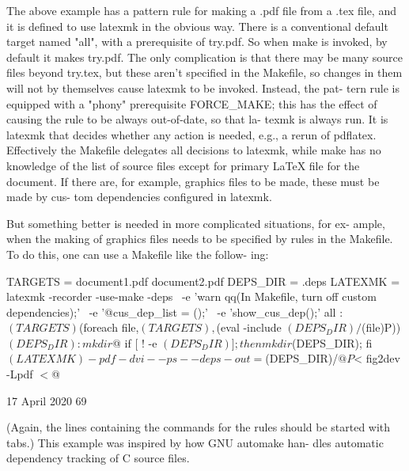        The above example has a pattern rule for making a .pdf file from a .tex
       file,  and it is defined to use latexmk in the obvious way.  There is a
       conventional  default  target  named  "all",  with  a  prerequisite  of
       try.pdf.   So  when  make is invoked, by default it makes try.pdf.  The
       only complication is  that  there  may  be  many  source  files  beyond
       try.tex, but these aren't specified in the Makefile, so changes in them
       will not by themselves cause latexmk to be invoked.  Instead, the  pat-
       tern  rule is equipped with a "phony" prerequisite FORCE_MAKE; this has
       the effect of causing the rule to be always out-of-date,  so  that  la-
       texmk  is always run.  It is latexmk that decides whether any action is
       needed, e.g., a rerun of pdflatex.  Effectively the Makefile  delegates
       all  decisions  to  latexmk, while make has no knowledge of the list of
       source files except for primary LaTeX file for the  document.  If there
       are, for example, graphics files to be made, these must be made by cus-
       tom dependencies configured in latexmk.

       But something better is needed in more complicated situations, for  ex-
       ample, when the making of graphics files needs to be specified by rules
       in the Makefile.  To do this, one can use a Makefile like  the  follow-
       ing:

            TARGETS = document1.pdf document2.pdf
            DEPS_DIR = .deps
            LATEXMK = latexmk -recorder -use-make -deps \
                  -e 'warn qq(In Makefile, turn off custom dependencies\n);' \
                  -e '@cus_dep_list = ();' \
                  -e 'show_cus_dep();'
            all : $(TARGETS)
            $(foreach file,$(TARGETS),$(eval -include $(DEPS_DIR)/$(file)P))
            $(DEPS_DIR) :
                   mkdir $@
                   if [ ! -e $(DEPS_DIR) ]; then mkdir $(DEPS_DIR); fi
                   $(LATEXMK) -pdf -dvi- -ps- -deps-out=$(DEPS_DIR)/$@P $<
                   fig2dev -Lpdf $< $@




                                 17 April 2020                              69








       (Again,  the  lines  containing  the  commands  for the rules should be
       started with tabs.)  This example was inspired by how GNU automake han-
       dles automatic dependency tracking of C source files.


